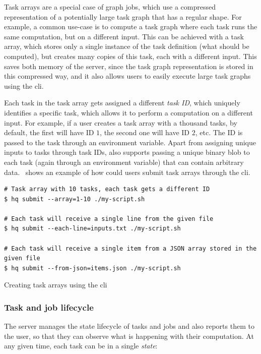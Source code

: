 Task arrays are a special case of graph jobs, which use a compressed representation of a
potentially large task graph that has a regular shape. For example, a common use-case is to compute
a task graph where each task runs the same computation, but on a different input. This can be
achieved with a task array, which stores only a single instance of the task definition (what should
be computed), but creates many copies of this task, each with a different input. This saves both
memory of the server, since the task graph representation is stored in this compressed way, and it
also allows users to easily execute large task graphs using the \gls{cli}.

Each task in the task array gets assigned a different \emph{task ID}, which uniquely
identifies a specific task, which allows it to perform a computation on a different input. For
example, if a user creates a task array with a thousand tasks, by default, the first will have ID
$1$, the second one will have ID $2$, etc. The ID is passed to
the task through an environment variable. Apart from assigning unique inputs to tasks through task
IDs, \hq{} also supports passing a unique binary blob to each task (again through
an environment variable) that can contain arbitrary data.~ shows an example
of how could users submit task arrays through the \gls{cli}.

\begin{listing}[h]
	\begin{verbatim}
# Task array with 10 tasks, each task gets a different ID
$ hq submit --array=1-10 ./my-script.sh

# Each task will receive a single line from the given file
$ hq submit --each-line=inputs.txt ./my-script.sh

# Each task will receive a single item from a JSON array stored in the given file
$ hq submit --from-json=items.json ./my-script.sh
	\end{verbatim}
	\caption{Creating task arrays using the \hyperqueue{} \gls{cli}}
	\label{lst:hq-cli-task-arrays}
\end{listing}

\subsubsection*{Task and job lifecycle}
The server manages the state lifecycle of tasks and jobs and also reports them to the user, so that
they can observe what is happening with their computation. At any given time, each task can be in a
single \emph{state}:

